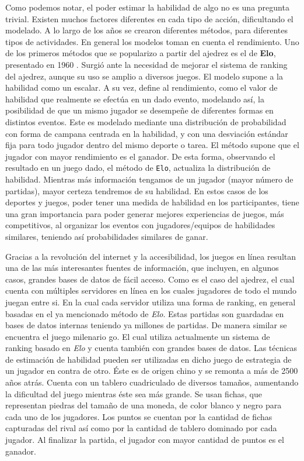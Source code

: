 \documentclass[11pt,twoside, spanish]{report} %
\begin{document}
Como podemos notar, el poder estimar la habilidad de algo no es una pregunta trivial.
Existen muchos factores diferentes en cada tipo de acci\'on, dificultando el modelado.
A lo largo de los a\~nos se crearon diferentes m\'etodos, para diferentes tipos de actividades.
En general los modelos toman en cuenta el rendimiento.
Uno de los primeros m\'etodos que se popularizo a partir del ajedrez es el de \textbf{Elo}, presentado en 1960 \cite{elo1961-uscf}.
Surgi\'o ante la necesidad de mejorar el sistema de ranking del ajedrez, aunque su uso se amplio a diversos juegos. 
El modelo supone a la habilidad como un escalar.
A su vez, define al rendimiento, como el valor de habilidad que realmente se efect\'ua en un dado evento, modelando as\'i, la posibilidad de que un mismo jugador se desempe\~ne de diferentes formas en distintos eventos.
Este es modelado mediante una distribuci\'on de probabilidad con forma de campana centrada en la habilidad, y con una desviaci\'on est\'andar fija para todo jugador dentro del mismo deporte o tarea.
El m\'etodo supone que el jugador con mayor rendimiento es el ganador.
De esta forma, observando el resultado en un juego dado, el m\'etodo de \texttt{Elo}, actualiza la distribuci\'on de habilidad.
Mientras m\'as informaci\'on tengamos de un jugador (mayor n\'umero de partidas), mayor certeza tendremos de su habilidad.
En estos casos de los deportes y juegos, poder tener una medida de habilidad en los participantes, tiene una gran importancia para poder generar mejores experiencias de juegos, m\'as competitivos, al organizar los eventos con jugadores/equipos de habilidades similares, teniendo as\'i probabilidades similares de ganar.



Gracias a la revoluci\'on del internet y la accesibilidad, los juegos en l\'inea resultan una de las m\'as interesantes fuentes de informaci\'on, que incluyen, en algunos casos, grandes bases de datos de f\'acil acceso.
Como es el caso del ajedrez, el cual cuenta con m\'ultiples servidores en l\'inea en los cuales jugadores de todo el mundo juegan entre si.
En la cual cada servidor utiliza una forma de ranking, en general basadas en el ya mencionado m\'etodo de \textit{Elo}.
Estas partidas son guardadas en bases de datos internas teniendo ya millones de partidas.
De manera similar se encuentra el juego milenario go.
El cual utiliza actualmente un sistema de ranking basado en \textit{Elo} y cuenta tambi\'en con grandes bases de datos.
Las t\'ecnicas de estimaci\'on de habilidad pueden ser utilizadas en dicho juego de estrategia de un jugador en contra de otro.
\'Este es de origen chino y se remonta a m\'as de 2500 a\~nos atr\'as.
Cuenta con un tablero cuadriculado de diversos tama\~nos, aumentando la dificultad del juego mientras \'este sea m\'as grande.
Se usan fichas, que representan piedras del tama\~no de una moneda, de color blanco y negro para cada uno de los jugadores.
Los puntos se cuentan por la cantidad de fichas capturadas del rival as\'i como por la cantidad de tablero dominado por cada jugador.
Al finalizar la partida, el jugador con mayor cantidad de puntos es el ganador.
\end{document}
